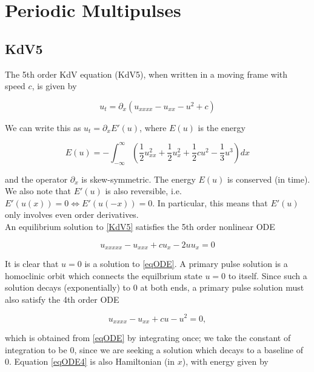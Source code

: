 \documentclass[12pt]{article}
\begin{document}
\section{Periodic Multipulses}

\subsection{KdV5}

The 5th order KdV equation (KdV5), when written in a moving frame with speed $c$, is given by

\begin{equation}\label{KdV5}
u_t = \partial_x(u_{xxxx} - u_{xx} - u^2 + c)
\end{equation}

We can write this as $u_t = \partial_x E'(u)$, where $E(u)$ is the energy

\begin{equation}\label{energy}
E(u) = -\int_{-\infty}^{\infty} \left( \frac{1}{2}u_{xx}^2 + \frac{1}{2}u_x^2 + \frac{1}{2}cu^2 - \frac{1}{3}u^3 \right) dx
\end{equation}

and the operator $\partial_x$ is skew-symmetric. The energy $E(u)$ is conserved (in time). We also note that $E'(u)$ is also reversible, i.e. $E'(u(x)) = 0 \iff E'(u(-x)) = 0$. In particular, this means that $E'(u)$ only involves even order derivatives.\\

An equilibrium solution to \eqref{KdV5} satisfies the 5th order nonlinear ODE

\begin{equation}\label{eqODE}
u_{xxxxx} - u_{xxx} + c u_x - 2 u u_x = 0
\end{equation}

It is clear that $u = 0$ is a solution to \eqref{eqODE}. A primary pulse solution is a homoclinic orbit which connects the equilbrium state $u = 0$ to itself. Since such a solution decays (exponentially) to 0 at both ends, a primary pulse solution must also satisfy the 4th order ODE

\begin{equation}\label{eqODE4}
u_{xxxx} - u_{xx} + c u - u^2 = 0,
\end{equation}

which is obtained from \eqref{eqODE} by integrating once; we take the constant of integration to be 0, since we are seeking a solution which decays to a baseline of 0. Equation \eqref{eqODE4} is also Hamiltonian (in $x$), with energy given by
\end{document}
